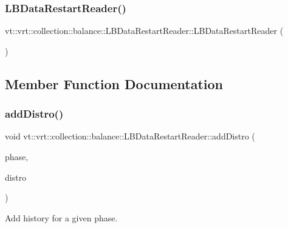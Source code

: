 \subsubsection{\texorpdfstring{L\+B\+Data\+Restart\+Reader()}{LBDataRestartReader()}}
{\footnotesize\ttfamily vt\+::vrt\+::collection\+::balance\+::\+L\+B\+Data\+Restart\+Reader\+::\+L\+B\+Data\+Restart\+Reader (\begin{DoxyParamCaption}{ }\end{DoxyParamCaption})\hspace{0.3cm}{\ttfamily [default]}}



\subsection{Member Function Documentation}
\mbox{\label{structvt_1_1vrt_1_1collection_1_1balance_1_1_l_b_data_restart_reader_abc1544f035265866b6d5ac2dae87d16e}} 
\subsubsection{\texorpdfstring{add\+Distro()}{addDistro()}}
{\footnotesize\ttfamily void vt\+::vrt\+::collection\+::balance\+::\+L\+B\+Data\+Restart\+Reader\+::add\+Distro (\begin{DoxyParamCaption}\item[{\hyperlink{namespacevt_a46ce6733d5cdbd735d561b7b4029f6d7}{Phase\+Type}}]{phase,  }\item[{const std\+::set$<$ \hyperlink{namespacevt_1_1vrt_1_1collection_1_1balance_a9f5b53fafb270212279a4757d2c4cd28}{Element\+I\+D\+Struct} $>$ \&}]{distro }\end{DoxyParamCaption})\hspace{0.3cm}{\ttfamily [inline]}}



Add history for a given phase. 


